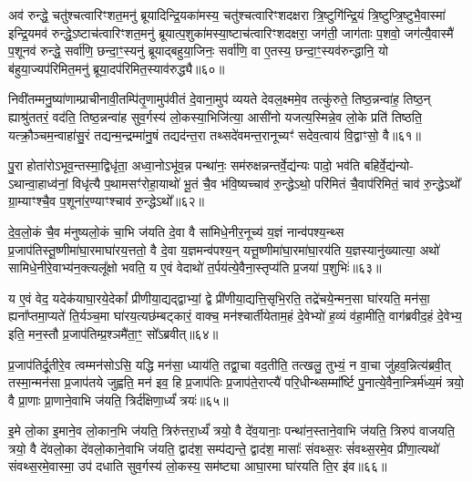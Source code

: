 अव॑ रुन्द्धे॒ चतु॑श्चत्वारिꣳशत॒मनु॑ ब्रूयादिन्द्रि॒यका॑मस्य॒ चतु॑श्चत्वारिꣳशदक्षरा त्रि॒ष्टुगि॑न्द्रि॒यं त्रि॒ष्टुप्त्रि॒ष्टुभै॒वास्मा॑ इन्द्रि॒यमव॑ रुन्द्धे॒\-ऽष्टाच॑त्वारिꣳशत॒मनु॑ ब्रूयात्प॒शुका॑मस्या॒ष्टाच॑त्वारिꣳशदक्षरा॒ जग॑ती॒ जाग॑ताः प॒शवो॒ जग॑त्यै॒वास्मै॑ प॒शूनव॑ रुन्द्धे॒ सर्वा॑णि॒ छन्दा॒ꣳ॒स्यनु॑ ब्रूयाद्बहुया॒जिनः॒ सर्वा॑णि॒ वा ए॒तस्य॒ छन्दा॒ꣳ॒स्यव॑रुन्द्धानि॒ यो ब॑हुया॒ज्यप॑रिमित॒मनु॑ ब्रूया॒दप॑रिमित॒स्याव॑रुद्ध्यै॥६०॥

{\anuvakamend[{का॒मये॑त॒ प्रति॑ष्ठित्यै प॒शून्थ्स॒प्तच॑त्वारिꣳशच्च॥10॥}]}

निवी॑तम्मनु॒ष्या॑णाम्प्राचीनावी॒तम्पि॑तृ॒णामुप॑वीतं दे॒वाना॒मुप॑ व्ययते देवल॒क्ष्ममे॒व तत्कु॑रुते॒ तिष्ठ॒न्नन्वा॑ह॒ तिष्ठ॒न् ह्याश्रु॑ततरं॒ वद॑ति॒ तिष्ठ॒न्नन्वा॑ह सुव॒र्गस्य॑ लो॒कस्या॒भिजि॑त्या॒ आसी॑नो यजत्य॒स्मिन्ने॒व लो॒के प्रति॑ तिष्ठति॒ यत्क्रौ॒ञ्चम॒न्वाहा॑सु॒रं तद्यन्म॒न्द्रम्मा॑नु॒षं तद्यद॑न्त॒रा तथ्सदे॑वमन्त॒रानूच्यꣳ॑ सदेव॒त्वाय॑ वि॒द्वाꣳसो॒ वै॥६१॥

पु॒रा होता॑रो\-ऽभूव॒न्तस्मा॒द्विधृ॑ता॒ अध्वा॒नो\-ऽभू॑व॒न्न पन्था॑नः॒ सम॑रुक्षन्नन्तर्वे॒द्य॑न्यः पादो॒ भव॑ति बहिर्वे॒द्य॑न्यो- \-ऽथान्वा॒हाध्व॑नां॒ विधृ॑त्यै प॒थामसꣳ॑रोहा॒याथो॑ भू॒तं चै॒व भ॑वि॒ष्यच्चाव॑ रु॒न्द्धे\-ऽथो॒ परि॑मितं चै॒वाप॑रिमितं॒ चाव॑ रु॒न्द्धे\-ऽथो᳚ ग्रा॒म्याꣳश्चै॒व प॒शूना॑र॒ण्याꣳश्चाव॑ रु॒न्द्धे\-ऽथो᳚॥६२॥

दे॒व॒लो॒कं चै॒व म॑नुष्यलो॒कं चा॒भि ज॑यति दे॒वा वै सा॑मिधे॒नीर॒नूच्य॑ य॒ज्ञं नान्व॑पश्य॒न्थ्स प्र॒जाप॑तिस्तू॒ष्णीमा॑घा॒रमाघा॑रय॒त्ततो॒ वै दे॒वा य॒ज्ञमन्व॑पश्य॒न् यत्तू॒ष्णीमा॑घा॒रमा॑घा॒रय॑ति य॒ज्ञस्यानु॑ख्यात्या॒ अथो॑ सामिधे॒नीरे॒वाभ्य॑न॒क्त्यलू᳚क्षो भवति॒ य ए॒वं वेदाथो॑ त॒र्पय॑त्ये॒वैना॒स्तृप्य॑ति प्र॒जया॑ प॒शुभिः॑॥६३॥

य ए॒वं वेद॒ यदेक॑याघा॒रये॒देकां᳚ प्रीणीया॒द्यद्द्वाभ्यां॒ द्वे प्री॑णीया॒द्यत्ति॒सृभि॒रति॒ तद्रे॑चये॒न्मन॒सा घा॑रयति॒ मन॑सा॒ ह्यना᳚प्तमा॒प्यते॑ ति॒र्यञ्च॒मा घा॑रय॒त्यछ॑म्बट्कारं॒ वाक्च॒ मन॑श्चार्तीयेताम॒हं दे॒वेभ्यो॑ ह॒व्यं व॑हा॒मीति॒ वाग॑ब्रवीद॒हं दे॒वेभ्य॒ इति॒ मन॒स्तौ प्र॒जाप॑तिम्प्र॒श्ञमै॑ता॒ꣳ॒ सो᳚\-ऽब्रवीत्॥६४॥

प्र॒जाप॑तिर्दू॒तीरे॒व त्वम्मन॑सो\-ऽसि॒ यद्धि मन॑सा॒ ध्याय॑ति॒ तद्वा॒चा वद॒तीति॒ तत्खलु॒ तुभ्यं॒ न वा॒चा जु॑हव॒न्नित्य॑ब्रवी॒त् तस्मा॒न्मन॑सा प्र॒जाप॑तये जुह्वति॒ मन॑ इव॒ हि प्र॒जाप॑तिः प्र॒जाप॑ते॒राप्त्यै॑ परि॒धीन्थ्सम्मा᳚र्ष्टि पु॒नात्ये॒वैना॒न्त्रिर्म॑ध्य॒मं त्रयो॒ वै प्रा॒णाः प्रा॒णाने॒वाभि ज॑यति॒ त्रिर्द॑क्षिणा॒र्ध्यं॑ त्रयः॑॥६५॥

इ॒मे लो॒का इ॒माने॒व लो॒कान॒भि ज॑यति॒ त्रिरु॑त्तरा॒र्ध्यं॑ त्रयो॒ वै दे॑व॒यानाः॒ पन्था॑न॒स्ताने॒वाभि ज॑यति॒ त्रिरुप॑ वाजयति॒ त्रयो॒ वै दे॑वलो॒का दे॑वलो॒काने॒वाभि ज॑यति॒ द्वाद॑श॒ सम्प॑द्यन्ते॒ द्वाद॑श॒ मासाः᳚ संवथ्स॒रः सं॑वथ्स॒रमे॒व प्री॑णा॒त्यथो॑ संवथ्स॒रमे॒वास्मा॒ उप॑ दधाति सुव॒र्गस्य॑ लो॒कस्य॒ सम॑ष्ट्या आघा॒रमा घा॑रयति ति॒र इ॑व॥६६॥

